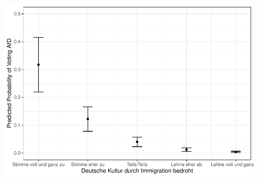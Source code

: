 \documentclass[
]{article}
\begin{document}
\includegraphics{AVCD_Final_Assignment-Edenhofer_files/figure-latex/afd-immig-culture-threat-1.pdf}
\end{document}
